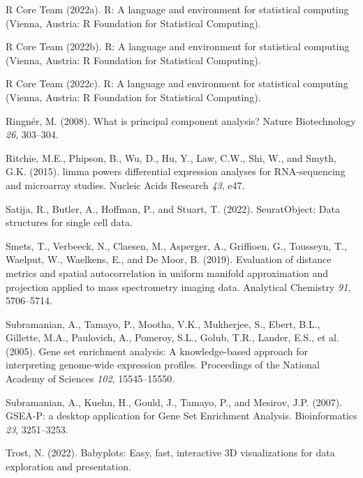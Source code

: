 \documentclass[
  parskip,
  oneside]{scrreprt}
\newlength{\cslhangindent}
\newlength{\cslentryspacingunit} %
\newenvironment{CSLReferences}[2] %
 {%
  \setlength{\parindent}{0pt}
  \ifodd #1
  \let\oldpar\par
  \def\par{\hangindent=\cslhangindent\oldpar}
  \fi
  \setlength{\parskip}{#2\cslentryspacingunit}
 }%
 {}
\begin{document}
\begin{CSLReferences}{0}{0}
\leavevmode{}%
R Core Team (2022a). R: A language and environment for statistical
computing (Vienna, Austria: R Foundation for Statistical Computing).

\leavevmode{}%
R Core Team (2022b). R: A language and environment for statistical
computing (Vienna, Austria: R Foundation for Statistical Computing).

\leavevmode{}%
R Core Team (2022c). R: A language and environment for statistical
computing (Vienna, Austria: R Foundation for Statistical Computing).

\leavevmode{}%
Ringnér, M. (2008). What is principal component analysis? Nature
Biotechnology \emph{26}, 303--304.

\leavevmode{}%
Ritchie, M.E., Phipson, B., Wu, D., Hu, Y., Law, C.W., Shi, W., and
Smyth, G.K. (2015). {limma} powers differential expression analyses for
{RNA}-sequencing and microarray studies. Nucleic Acids Research
\emph{43}, e47.

\leavevmode{}%
Satija, R., Butler, A., Hoffman, P., and Stuart, T. (2022).
SeuratObject: Data structures for single cell data.

\leavevmode{}%
Smets, T., Verbeeck, N., Claesen, M., Asperger, A., Griffioen, G.,
Tousseyn, T., Waelput, W., Waelkens, E., and De Moor, B. (2019).
Evaluation of distance metrics and spatial autocorrelation in uniform
manifold approximation and projection applied to mass spectrometry
imaging data. Analytical Chemistry \emph{91}, 5706--5714.

\leavevmode{}%
Subramanian, A., Tamayo, P., Mootha, V.K., Mukherjee, S., Ebert, B.L.,
Gillette, M.A., Paulovich, A., Pomeroy, S.L., Golub, T.R., Lander, E.S.,
et al. (2005). Gene set enrichment analysis: A knowledge-based approach
for interpreting genome-wide expression profiles. Proceedings of the
National Academy of Sciences \emph{102}, 15545--15550.

\leavevmode{}%
Subramanian, A., Kuehn, H., Gould, J., Tamayo, P., and Mesirov, J.P.
(2007). {GSEA-P: a desktop application for Gene Set Enrichment
Analysis}. Bioinformatics \emph{23}, 3251--3253.

\leavevmode{}%
Trost, N. (2022). Babyplots: Easy, fast, interactive 3D visualizations
for data exploration and presentation.


\end{CSLReferences}
\end{document}
